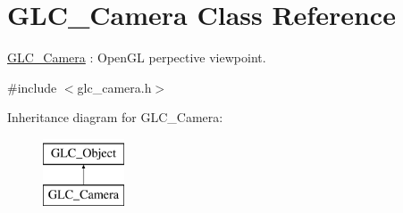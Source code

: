 \hypertarget{class_g_l_c___camera}{\section{G\-L\-C\-\_\-\-Camera Class Reference}
\label{class_g_l_c___camera}
}


\hyperlink{class_g_l_c___camera}{G\-L\-C\-\_\-\-Camera} \-: Open\-G\-L perpective viewpoint.  




{\ttfamily \#include $<$glc\-\_\-camera.\-h$>$}

Inheritance diagram for G\-L\-C\-\_\-\-Camera\-:\begin{figure}[H]
\begin{center}
\leavevmode
\includegraphics[height=2.000000cm]{class_g_l_c___camera}
\end{center}
\end{figure}
